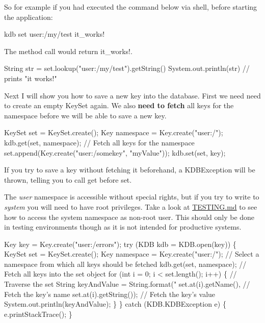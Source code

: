 So for example if you had executed the command below via shell, before starting the application\+:


\begin{DoxyCode}
kdb set user:/my/test it\_works!
\end{DoxyCode}


The method call would return {\ttfamily it\+\_\+works!}.


\begin{DoxyCode}
String str = \textcolor{keyword}{set}.lookup(\textcolor{stringliteral}{"user:/my/test"}).getString()
System.out.println(str)    \textcolor{comment}{// prints "it works!"}
\end{DoxyCode}


Next I will show you how to save a new key into the database. First we need need to create an empty {\ttfamily Key\+Set} again. We also {\bfseries need to fetch} all keys for the namespace before we will be able to save a new key.


\begin{DoxyCode}
KeySet \textcolor{keyword}{set} = KeySet.create();
Key \textcolor{keyword}{namespace }= Key.create("user:/");
kdb.get(set, namespace);    \textcolor{comment}{// Fetch all keys for the namespace}
set.append(Key.create("user:/somekey", "myValue"));
kdb.set(set, key);
\end{DoxyCode}


If you try to save a key without fetching it beforehand, a {\ttfamily K\+D\+B\+Exception} will be thrown, telling you to call get before set.

The {\itshape user} namespace is accessible without special rights, but if you try to write to {\itshape system} you will need to have root privileges. Take a look at \hyperlink{doc_TESTING_md}{T\+E\+S\+T\+I\+NG.md} to see how to access the system namespace as non-\/root user. This should only be done in testing environments though as it is not intended for productive systems.


\begin{DoxyCode}
Key key = Key.create(\textcolor{stringliteral}{"user:/errors"});
\textcolor{keywordflow}{try} (KDB kdb = KDB.open(key)) \{
    KeySet \textcolor{keyword}{set} = KeySet.create();
    Key \textcolor{keyword}{namespace }= Key.create("user:/");     \textcolor{comment}{// Select a namespace from which all keys should be fetched}
    kdb.get(set, namespace);                  \textcolor{comment}{// Fetch all keys into the set object}
    for (int i = 0; i < set.length(); i++) \{  \textcolor{comment}{// Traverse the set}
        String keyAndValue = String.format("%
                set.at(i).getName(),          \textcolor{comment}{// Fetch the key's name}
                set.at(i).getString());       \textcolor{comment}{// Fetch the key's value}
        System.out.println(keyAndValue);
    \}
\} catch (KDB.KDBException e) \{
    e.printStackTrace();
\}
\end{DoxyCode}


